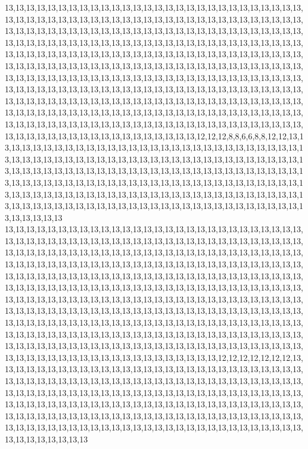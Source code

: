 13,13,13,13,13,13,13,13,13,13,13,13,13,13,13,13,13,13,13,13,13,13,13,13,13,13,13,13,13,13,13,13,13,13,13,13,13,13,13,13,13,13,13,13,13,13,13,13,13,13,13,13,13,13,13,13,13,13,13,13,13,13,13,13,13,13,13,13,13,13,13,13,13,13,13,13,13,13,13,13,13,13,13,13,13,13,13,13,13,13,13,13,13,13,13,13,13,13,13,13,13,13,13,13,13,13,13,13,13,13,13,13,13,13,13,13,13,13,13,13,13,13,13,13,13,13,13,13,13,13,13,13,13,13,13,13,13,13,13,13,13,13,13,13,13,13,13,13,13,13,13,13,13,13,13,13,13,13,13,13,13,13,13,13,13,13,13,13,13,13,13,13,13,13,13,13,13,13,13,13,13,13,13,13,13,13,13,13,13,13,13,13,13,13,13,13,13,13,13,13,13,13,13,13,13,13,13,13,13,13,13,13,13,13,13,13,13,13,13,13,13,13,13,13,13,13,13,13,13,13,13,13,13,13,13,13,13,13,13,13,13,13,13,13,13,13,13,13,13,13,13,13,13,13,13,13,13,13,13,13,13,13,13,13,13,13,13,13,13,13,13,13,13,13,13,13,13,13,13,13,13,13,13,13,13,13,13,13,13,13,13,13,13,13,13,13,13,13,13,13,13,13,13,13,13,13,13,13,13,13,13,13,13,13,13,13,13,13,13,13,13,13,13,13,13,13,12,12,12,8,8,6,6,8,8,12,12,13,13,13,13,13,13,13,13,13,13,13,13,13,13,13,13,13,13,13,13,13,13,13,13,13,13,13,13,13,13,13,13,13,13,13,13,13,13,13,13,13,13,13,13,13,13,13,13,13,13,13,13,13,13,13,13,13,13,13,13,13,13,13,13,13,13,13,13,13,13,13,13,13,13,13,13,13,13,13,13,13,13,13,13,13,13,13,13,13,13,13,13,13,13,13,13,13,13,13,13,13,13,13,13,13,13,13,13,13,13,13,13,13,13,13,13,13,13,13,13,13,13,13,13,13,13,13,13,13,13,13,13,13,13,13,13,13,13,13,13,13,13,13,13,13,13,13,13,13,13,13,13,13,13,13,13,13,13,13,13,13,13,13,13,13,13,13,13,13,13,13,13,13,13,13
13,13,13,13,13,13,13,13,13,13,13,13,13,13,13,13,13,13,13,13,13,13,13,13,13,13,13,13,13,13,13,13,13,13,13,13,13,13,13,13,13,13,13,13,13,13,13,13,13,13,13,13,13,13,13,13,13,13,13,13,13,13,13,13,13,13,13,13,13,13,13,13,13,13,13,13,13,13,13,13,13,13,13,13,13,13,13,13,13,13,13,13,13,13,13,13,13,13,13,13,13,13,13,13,13,13,13,13,13,13,13,13,13,13,13,13,13,13,13,13,13,13,13,13,13,13,13,13,13,13,13,13,13,13,13,13,13,13,13,13,13,13,13,13,13,13,13,13,13,13,13,13,13,13,13,13,13,13,13,13,13,13,13,13,13,13,13,13,13,13,13,13,13,13,13,13,13,13,13,13,13,13,13,13,13,13,13,13,13,13,13,13,13,13,13,13,13,13,13,13,13,13,13,13,13,13,13,13,13,13,13,13,13,13,13,13,13,13,13,13,13,13,13,13,13,13,13,13,13,13,13,13,13,13,13,13,13,13,13,13,13,13,13,13,13,13,13,13,13,13,13,13,13,13,13,13,13,13,13,13,13,13,13,13,13,13,13,13,13,13,13,13,13,13,13,13,13,13,13,13,13,13,13,13,13,13,13,13,13,13,13,13,13,13,13,13,13,13,13,13,13,13,13,13,13,13,13,13,13,13,13,13,13,13,13,13,13,13,13,13,13,13,13,13,13,13,13,13,12,12,12,12,12,12,12,13,13,13,13,13,13,13,13,13,13,13,13,13,13,13,13,13,13,13,13,13,13,13,13,13,13,13,13,13,13,13,13,13,13,13,13,13,13,13,13,13,13,13,13,13,13,13,13,13,13,13,13,13,13,13,13,13,13,13,13,13,13,13,13,13,13,13,13,13,13,13,13,13,13,13,13,13,13,13,13,13,13,13,13,13,13,13,13,13,13,13,13,13,13,13,13,13,13,13,13,13,13,13,13,13,13,13,13,13,13,13,13,13,13,13,13,13,13,13,13,13,13,13,13,13,13,13,13,13,13,13,13,13,13,13,13,13,13,13,13,13,13,13,13,13,13,13,13,13,13,13,13,13,13,13,13,13,13,13,13,13,13,13,13,13,13,13,13,13,13,13,13,13,13,13,13,13
